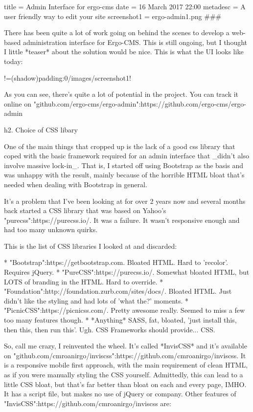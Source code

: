 title = Admin Interface for ergo-cms
date = 16 March 2017 22:00
metadesc = A user friendly way to edit your site
screenshot1 = ergo-admin1.png
###

There has been quite a lot of work going on behind the scenes to develop a web-based administration interface for Ergo-CMS. This is still ongoing, but I thought I little *teaser* about the solution would be nice. This is what the UI looks like today:

!=(shadow){padding:0}/images/{{{screenshot1}}}!

As you can see, there's quite a lot of potential in the project. You can track it online on "github.com/ergo-cms/ergo-admin":https://github.com/ergo-cms/ergo-admin

h2. Choice of CSS libary

One of the main things that cropped up is the lack of a good css library that coped with the basic framework required for an admin interface that _didn't also involve massive lock-in_. That is, I started off using Bootstrap as the basis and was unhappy with the result, mainly because of the horrible HTML bloat that's needed when dealing with Bootstrap in general. 

It's a problem that I've been looking at for over 2 years now and several months back started a CSS library that was based on Yahoo's "purecss":https://purecss.io/. It was a failure. It wasn't responsive enough and had too many unknown quirks.

This is the list of CSS libraries I looked at and discarded:

* "Bootstrap":https://getbootstrap.com. Bloated HTML. Hard to 'recolor'. Requires jQuery.
* "PureCSS":https://purecss.io/. Somewhat bloated HTML, but LOTS of branding in the HTML. Hard to override.
* "Foundation":http://foundation.zurb.com/sites/docs/. Bloated HTML. Just didn't like the styling and had lots of 'what the?' moments.
* "PicnicCSS":https://picnicss.com/. Pretty awesome really. Seemed to miss a few too many features though.
* *Anything* SASS, fat, bloated, 'just install this, then this, then run this'. Ugh. CSS Frameworks should provide... CSS.

So, call me crazy, I reinvented the wheel. It's called *InvisCSS* and it's available on "github.com/cmroanirgo/inviscss":https://github.com/cmroanirgo/inviscss. It is a responsive mobile first approach, with the main requirement of clean HTML, as if you were manually styling the CSS yourself. Admittedly, this can lead to a little CSS bloat, but that's far better than bloat on each and every page, IMHO. It has a script file, but makes no use of jQuery or company. Other features of "InvisCSS":https://github.com/cmroanirgo/inviscss are:

